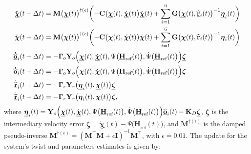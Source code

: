 \begin{align}
    \begin{split}
        \ddot{\underline{\boldsymbol{\chi}}}(t+\Delta t) &= \mathbf{M}\bigl(\underline{\boldsymbol{\chi}}(t)\bigr)^{\dagger(\epsilon)}\biggl(-\mathbf{C}\bigl(\underline{\boldsymbol{\chi}}(t), \underline{\dot{\boldsymbol{\chi}}}(t)\bigr)\underline{\dot{\boldsymbol{\chi}}}(t)  + \sum_{i=1}^6 \mathbf{G}\bigl(\underline{\boldsymbol{\chi}}(t), \underline{\widehat{\mathbf{r}}}_i(t)\bigr)^{-1}\underline{\boldsymbol{\eta}}_i(t)\biggr)\\
        \ddot{{\boldsymbol{\chi}}}(t+\Delta t) &= \mathbf{M}\bigl({\boldsymbol{\chi}}(t)\bigr)^{\dagger(\epsilon)}\biggl(-\mathbf{C}\bigl({\boldsymbol{\chi}}(t), {\dot{\boldsymbol{\chi}}}(t)\bigr)\dot{\boldsymbol{\chi}}(t)  + \sum_{i=1}^6 \mathbf{G}\bigl({\boldsymbol{\chi}}(t), {\widehat{\mathbf{r}}}_i(t)\bigr)^{-1}{\boldsymbol{\eta}}_i(t)\biggr)\\
        \underline{\dot{\widehat{\mathbf{o}}}}_i(t + \Delta t) &= -\boldsymbol{\Gamma}_o\mathbf{Y}_o\Bigl(\underline{\boldsymbol{\chi}}(t), \underline{\dot{\boldsymbol{\chi}}}(t), \Psi\bigl(\underline{\mathbf{H}}_\text{ref}(t)\bigr), \dot{\Psi}\bigl(\underline{\mathbf{H}}_\text{ref}(t)\bigr)\Bigr)\underline{\boldsymbol{\zeta}}\\
        {\dot{\widehat{\mathbf{o}}}}_i(t + \Delta t) &= -\boldsymbol{\Gamma}_o\mathbf{Y}_o\Bigl({\boldsymbol{\chi}}(t), {\dot{\boldsymbol{\chi}}}(t), \Psi\bigl({\mathbf{H}_\text{ref}}(t)\bigr), \dot{\Psi}\bigl({\mathbf{H}_\text{ref}}(t)\bigr)\Bigr){\boldsymbol{\zeta}}\\
        \underline{\dot{\widehat{\mathbf{r}}}}_i(t + \Delta t) &= -\boldsymbol{\Gamma}_r\mathbf{Y}_r\bigl(\underline{\boldsymbol{\eta}}_i(t), \underline{\boldsymbol{\chi}}(t)\bigr)\underline{\boldsymbol{\zeta}}\\
        \underline{\dot{\widehat{\mathbf{r}}}}_i(t + \Delta t) &= -\boldsymbol{\Gamma}_r\mathbf{Y}_r\bigl({\boldsymbol{\eta}}_i(t), {\boldsymbol{\chi}}(t)\bigr){\boldsymbol{\zeta}},
    \end{split}
\end{align}
where $\underline{\boldsymbol{\eta}}_i(t) = \mathbf{Y}_o\Bigl(\underline{\boldsymbol{\chi}}(t), \underline{\dot{\boldsymbol{\chi}}}(t), \Psi\bigl(\underline{\mathbf{H}}_\text{ref}(t)\bigr), \dot{\Psi}\bigl(\underline{\mathbf{H}}_\text{ref}(t)\bigr)\Bigr)\underline{\widehat{\mathbf{o}}}_i(t) - \mathbf{K}_D\underline{\boldsymbol{\zeta}}$, $\underline{\boldsymbol{\zeta}}$ is the intermediary velocity error $\underline{\boldsymbol{\zeta}}=\underline{\dot{\boldsymbol{\chi}}}(t) - \Psi\bigl(\underline{\mathbf{H}}_\text{ref}(t)\bigr)$, and $\mathbf{M}^{\dagger(\epsilon)}$ is the damped pseudo-inverse $\mathbf{M}^{\dagger(\epsilon)} = (\mathbf{M}^\top\mathbf{M} + \epsilon\mathbf{I})^{-1}\mathbf{M}^\top$, with $\epsilon=0.01$. The update for the system's twist and parameters estimates is given by:
